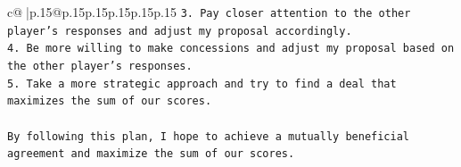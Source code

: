 \documentclass{article}
\begin{document}
{\begin{supertabular}{c@{$\;$}|p{.15\linewidth}@{}p{.15\linewidth}p{.15\linewidth}p{.15\linewidth}p{.15\linewidth}p{.15\linewidth}}
{{{\texttt{3. Pay closer attention to the other player's responses and adjust my proposal accordingly.} \\
\texttt{4. Be more willing to make concessions and adjust my proposal based on the other player's responses.} \\
\texttt{5. Take a more strategic approach and try to find a deal that maximizes the sum of our scores.} \\
\\ 
\texttt{By following this plan, I hope to achieve a mutually beneficial agreement and maximize the sum of our scores.} \\
            }
        }
    }
     \\ \\

\end{supertabular}
}
\end{document}
